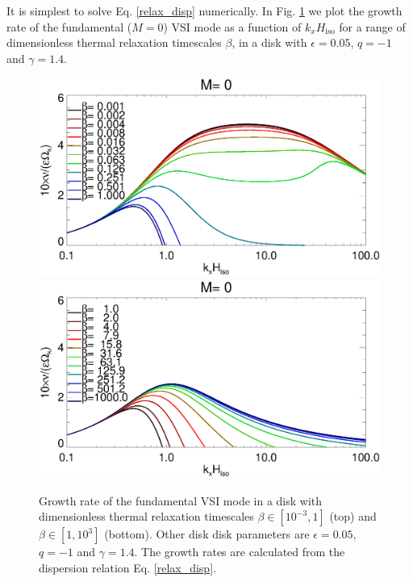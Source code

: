 It is simplest to solve Eq. \ref{relax_disp} numerically. In
Fig. \ref{relax_disp_fig} we plot the growth rate of the fundamental
($M=0$) VSI mode as a function of $k_xH_\mathrm{iso}$ for a range of
dimensionless thermal relaxation timescales $\beta$, in a disk with
$\epsilon=0.05$, $q=-1$ and $\gamma=1.4$. 

\begin{figure}
  \includegraphics[width=\linewidth,clip=true,trim=0cm 1.75cm 0cm 0cm]{figures/rate_theory_grow_relax}
  \includegraphics[width=\linewidth,clip=true,trim=0cm 0cm 0cm 1cm]{figures/rate_theory_grow_relax2}
  \caption{Growth rate of the fundamental VSI mode in a disk with
    dimensionless thermal relaxation timescales
    $\beta\in[10^{-3},1]$ (top) and $\beta\in[1,10^3]$ (bottom).
Other disk disk parameters are
    $\epsilon=0.05$, $q=-1$ and $\gamma=1.4$. The growth rates are
    calculated from the dispersion relation Eq. \ref{relax_disp}. 
    \label{relax_disp_fig}}  
\end{figure}   








